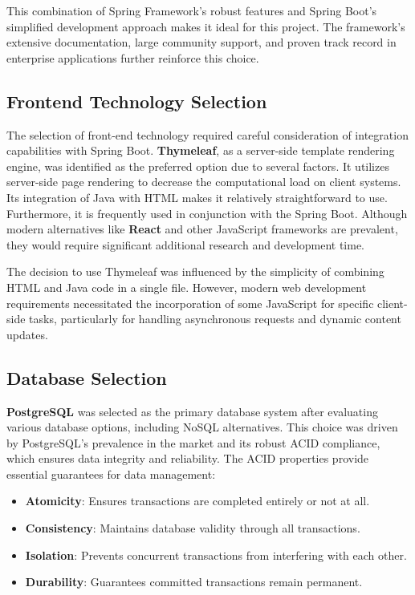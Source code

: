 This combination of Spring Framework's robust features and Spring Boot's simplified development approach makes it ideal for this project.
The framework's extensive documentation, large community support, and proven track record in enterprise applications further reinforce this choice.

\subsection{Frontend Technology Selection}\label{subsec:frontend-selection}

The selection of front-end technology required careful consideration of integration capabilities with Spring Boot.
\textbf{Thymeleaf}, as a server-side template rendering engine, was identified as the preferred option due to several factors. It utilizes server-side page rendering to decrease the computational load on client systems. Its integration of Java with HTML makes it relatively straightforward to use. Furthermore, it is frequently used in conjunction with the Spring Boot.
Although modern alternatives like \textbf{React} and other JavaScript frameworks are prevalent, they would require significant additional research and development time.

The decision to use Thymeleaf was influenced by the simplicity of combining HTML and Java code in a single file.
However, modern web development requirements necessitated the incorporation of some JavaScript for specific client-side tasks, particularly for handling asynchronous requests and dynamic content updates.

\subsection{Database Selection}\label{subsec:database-selection}

\textbf{PostgreSQL} was selected as the primary database system after evaluating various database options, including NoSQL alternatives.
This choice was driven by PostgreSQL's prevalence in the market and its robust ACID compliance, which ensures data integrity and reliability.
The ACID properties provide essential guarantees for data management:

\begin{itemize}
    \item \textbf{Atomicity}: Ensures transactions are completed entirely or not at all.
    \item \textbf{Consistency}: Maintains database validity through all transactions.
    \item \textbf{Isolation}: Prevents concurrent transactions from interfering with each other.
    \item \textbf{Durability}: Guarantees committed transactions remain permanent.
\end{itemize}

